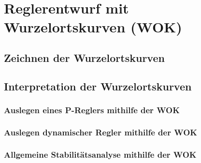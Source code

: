 \section{Reglerentwurf mit Wurzelortskurven (WOK)}

\subsection{Zeichnen der Wurzelortskurven}

\subsection{Interpretation der Wurzelortskurven}

\subsubsection{Auslegen eines P-Reglers mithilfe der WOK}

\subsubsection{Auslegen dynamischer Regler mithilfe der WOK}

\subsubsection{Allgemeine Stabilitätsanalyse mithilfe der WOK}

